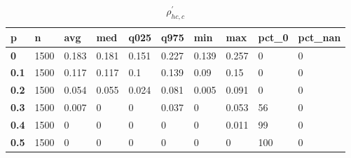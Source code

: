 \begin{table}[h]
 \centering 
\footnotesize
\caption{$\rho_{hc,c}^\prime $}
\label{tab:alphahcc}
\begin{tabular}[h]{|l|l|l|l|l|l|l|l|l|l|
    } \hline
\textbf{ p} & \textbf{ n} & \textbf{ avg} & \textbf{ med} & \textbf{ q025} & \textbf{ q975} & \textbf{ min} & \textbf{ max} & \textbf{ pct\_0} & \textbf{ pct\_nan}
    \\ \hline
  \textbf{  0} & 1500 & 0.183 & 0.181 & 0.151 & 0.227 & 0.139 & 0.257 &   0 & 0
    \\ \hline
  \textbf{0.1} & 1500 & 0.117 & 0.117 &   0.1 & 0.139 &  0.09 &  0.15 &   0 & 0
    \\ \hline
  \textbf{0.2} & 1500 & 0.054 & 0.055 & 0.024 & 0.081 & 0.005 & 0.091 &   0 & 0
    \\ \hline
  \textbf{0.3} & 1500 & 0.007 &     0 &     0 & 0.037 &     0 & 0.053 &  56 & 0
    \\ \hline
  \textbf{0.4} & 1500 &     0 &     0 &     0 &     0 &     0 & 0.011 &  99 & 0
    \\ \hline
  \textbf{0.5} & 1500 &     0 &     0 &     0 &     0 &     0 &     0 & 100 & 0
    \\ \hline
 \end{tabular}
 \end{table}
